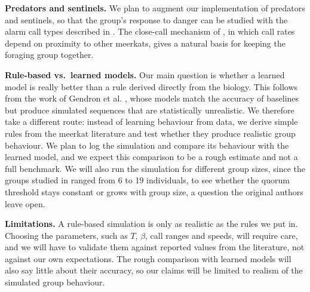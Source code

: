 \documentclass[9pt,twoside]{pnas-new}
\begin{document}
\textbf{Predators and sentinels.} We plan to augment our implementation of predators and sentinels, so that the group's response to danger can be studied with the alarm call types described in \cite{rauber2017discrete}. The close-call mechanism of \cite{engesser2022collective}, in which call rates depend on proximity to other meerkats, gives a natural basis for keeping the foraging group together.

\textbf{Rule-based vs.\ learned models.} Our main question is whether a learned model is really better than a rule derived directly from the biology. This follows from the work of Gendron et al. \cite{gendron2023behaviour}, whose models match the accuracy of baselines but produce simulated sequences that are statistically unrealistic. We therefore take a different route: instead of learning behaviour from data, we derive simple rules from the meerkat literature and test whether they produce realistic group behaviour. We plan to log the simulation and compare its behaviour with the learned model, and we expect this comparison to be a rough estimate and not a full benchmark. We will also run the simulation for different group sizes, since the groups studied in \cite{bousquet2011moving} ranged from 6 to 19 individuals, to see whether the quorum threshold stays constant or grows with group size, a question the original authors leave open.

\textbf{Limitations.} A rule-based simulation is only as realistic as the rules we put in. Choosing the parameters, such as $T$, $\beta$, call ranges and speeds, will require care, and we will have to validate them against reported values from the literature, not against our own expectations. The rough comparison with learned models will also say little about their accuracy, so our claims will be limited to realism of the simulated group behaviour.


%




\end{document}
